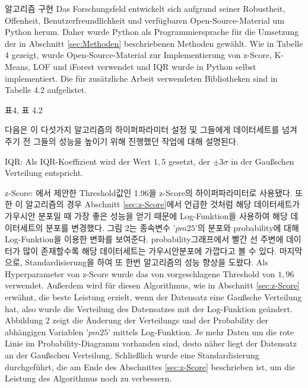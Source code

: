     알고리즘 구현
        Das Forschungsfeld entwickelt sich aufgrund seiner Robustheit, Offenheit, Benutzerfreundlichkeit und verfügbaren Open-Source-Material um Python herum. Daher wurde Python als Programmiersprache für die Umsetzung der in Abschnitt \ref{sec:Methoden} beschriebenen Methoden gewählt. Wie in Tabelle 4 gezeigt, wurde Open-Source-Material zur Implementierung von z-Score, K-Means, LOF und iForest verwendet und IQR wurde in Python selbst implementiert. Die für zusätzliche Arbeit verwendeten Bibliotheken sind in Tabelle 4.2 aufgelistet.
        
        표4, 표 4.2

        다음은 이 다섯가지 알고리즘의 하이퍼파라미터 설정 및 그들에게 데이터세트를 넘겨주기 전 그들의 성능을 높이기 위해 진행했던 작업에 대해 설명된다.

        IQR: Als IQR-Koeffizient wird der Wert $1,5$ gesetzt, der $\pm3\sigma$ in der Gaußschen Verteilung entspricht.

        z-Score: \cite{Killourhy09}에서 제안한 Threshold값인 1.96을 z-Score의 하이퍼파라미터로 사용됐다. 또한 이 알고리즘의 경우 Abschnitt \ref{sec:z-Score}에서 언급한 것처럼 해당 데이터세트가 가우시안 분포일 때 가장 좋은 성능을 얻기 때문에 Log-Funktion을 사용하여 해당 데이터세트의 분포를 변경했다. 그림 2는 종속변수 '$pm25$'의 분포와 probability에 대해 Log-Funktion을 이용한 변화를 보여준다. probability그래프에서 빨간 선 주변에 데이터가 많이 존재할수록 해당 데이터세트는 가우시안분포에 가깝다고 볼 수 있다. 마지막으로, Standardisierung을 하여 또 한번 알고리즘의 성능 향상을 도왔다.
        Als Hyperparameter von z-Score wurde das von \cite{Killourhy09} vorgeschlagene Threshold von $1,96$ verwendet. Außerdem wird für diesen Algorithmus, wie in Abschnitt \ref{sec:z-Score} erwähnt, die beste Leistung erzielt, wenn der Datensatz eine Gaußsche Verteilung hat, also wurde die Verteilung des Datensatzes mit der Log-Funktion geändert. Abbildung 2 zeigt die Änderung der Verteilungs und der Probability der abhängigen Variablen '$pm25$' mittels Log-Funktion. Je mehr Daten um die rote Linie im Probability-Diagramm vorhanden sind, desto näher liegt der Datensatz an der Gaußschen Verteilung. Schließlich wurde eine Standardisierung durchgeführt, die am Ende des Abschnittes \ref{sec:z-Score} beschrieben ist, um die Leistung des Algorithmus noch zu verbessern.

